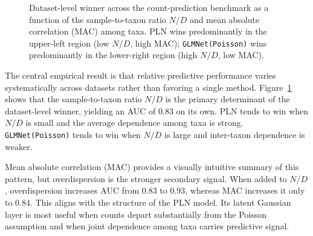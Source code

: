 \documentclass{jmlr}
\begin{document}
\begin{figure}[t]
\centering
{}
\caption{Dataset-level winner across the count-prediction benchmark as a function
of the sample-to-taxon ratio $N/D$ and mean absolute correlation (MAC) among taxa.
PLN wins predominantly in the upper-left region (low $N/D$, high MAC);
\texttt{GLMNet(Poisson)} wins predominantly in the lower-right region (high $N/D$, low MAC).}
\label{fig:mac-nd-2d}
\end{figure}

The central empirical result is that relative predictive performance varies systematically across datasets rather than favoring a single method.
Figure~\ref{fig:mac-nd-2d} shows that the sample-to-taxon ratio $N/D$ is the primary determinant of the dataset-level winner, yielding an AUC of 0.83 on its own.
PLN tends to win when $N/D$ is small and the average dependence among taxa is strong.
\texttt{GLMNet(Poisson)} tends to win when $N/D$ is large and inter-taxon dependence is weaker.

Mean absolute correlation (MAC) provides a visually intuitive summary of this pattern, but overdispersion is the stronger secondary signal.
When added to $N/D$, overdispersion increases AUC from 0.83 to 0.93, whereas MAC increases it only to 0.84.
This aligns with the structure of the PLN model.
Its latent Gaussian layer is most useful when counts depart substantially from the Poisson assumption and when joint dependence among taxa carries predictive signal.
\end{document}

